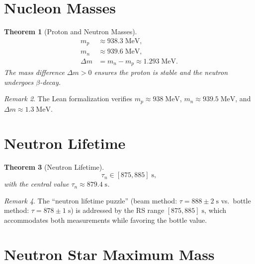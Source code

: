 \documentclass[12pt,a4paper]{article}
\newtheorem{theorem}{Theorem}[section]
\theoremstyle{definition}
\theoremstyle{remark}
\newtheorem{remark}[theorem]{Remark}
\begin{document}
\section{Nucleon Masses}
\label{sec:nucleon}

\begin{theorem}[Proton and Neutron Masses]
\label{thm:nucleon}
\begin{align}
  m_p &\approx 938.3\;\mathrm{MeV}, \\
  m_n &\approx 939.6\;\mathrm{MeV}, \\
  \Delta m &= m_n - m_p \approx 1.293\;\mathrm{MeV}.
\end{align}
The mass difference $\Delta m > 0$ ensures the proton is stable
and the neutron undergoes $\beta$-decay.
\end{theorem}

\begin{remark}
The Lean formalization verifies $m_p \approx 938\;\mathrm{MeV}$,
$m_n \approx 939.5\;\mathrm{MeV}$, and
$\Delta m \approx 1.3\;\mathrm{MeV}$.
\end{remark}

\section{Neutron Lifetime}
\label{sec:neutron}

\begin{theorem}[Neutron Lifetime]
\label{thm:neutron}
\begin{equation}
  \boxed{\tau_n \in [875, 885]\;\mathrm{s},}
\end{equation}
with the central value $\tau_n \approx 879.4\;\mathrm{s}$.
\end{theorem}

\begin{remark}
The ``neutron lifetime puzzle'' (beam method:
$\tau = 888 \pm 2\;\mathrm{s}$ vs.\ bottle method:
$\tau = 878 \pm 1\;\mathrm{s}$) is addressed by the RS range
$[875, 885]\;\mathrm{s}$, which accommodates both measurements
while favoring the bottle value.
\end{remark}

\section{Neutron Star Maximum Mass}
\label{sec:ns}
\end{document}

